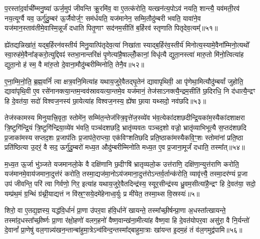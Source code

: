 प॒रस्ता॑द॒र्वाची᳚म्मनु॒ष्या॑ ऊर्ज॒मुप॑ जीवन्ति क्रू॒रमि॑व॒ वा ए॒तत्क॑रोति॒ यत्खन॑त्य॒पो\-ऽव॑ नयति॒ शान्त्यै॒ यव॑मती॒रव॑ नय॒त्यूर्ग्वै यव॒ ऊर्गु॑दु॒म्बर॑ ऊ॒र्जैवोर्ज॒ꣳ॒ सम॑र्धयति॒ यज॑मानेन॒ सम्मि॒तौदु॑म्बरी भवति॒ यावा॑ने॒व यज॑मान॒स्ताव॑तीमे॒वास्मि॒न्नूर्जं॑ दधाति पितृ॒णाꣳ सद॑नम॒सीति॑ ब॒र्\mbox{}हिरव॑ स्तृणाति पितृदेव॒त्यम्᳚॥५१॥

ह्ये॑तद्यन्निखा॑तं॒ यद्ब॒र्\mbox{}हिरन॑वस्तीर्य मिनु॒यात्पि॑तृदेव॒त्या॑ निखा॑ता स्याद्ब॒र्\mbox{}हिर॑व॒स्तीर्य॑ मिनोत्य॒स्यामे॒वैना᳚म्मिनो॒त्यथो᳚ स्वा॒रुह॑मे॒वैना᳚ङ्करो॒त्युद्दिवꣴ॑ स्तभा॒नान्तरि॑क्षं पृ॒णेत्या॑है॒षाल्लोँ॒कानां॒ विधृ॑त्यै द्युता॒नस्त्वा॑ मारु॒तो मि॑नो॒त्वित्या॑ह द्युता॒नो ह॑ स्म॒ वै मा॑रु॒तो दे॒वाना॒मौदु॑म्बरीम्मिनोति॒ तेनै॒व॥५२॥

ए॒ना॒म्मि॒नो॒ति॒ ब्र॒ह्म॒वनिं᳚ त्वा क्षत्र॒वनि॒मित्या॑ह यथाय॒जुरे॒वैतद्घृ॒तेन॑ द्यावापृथिवी॒ आ पृ॑णेथा॒मित्यौदु॑म्बर्यां जुहोति॒ द्यावा॑पृथि॒वी ए॒व रसे॑नानक्त्या॒न्तम॒न्वव॑स्रावयत्या॒न्तमे॒व यज॑मानं॒ तेज॑सा\-ऽनक्त्यै॒न्द्रम॒सीति॑ छ॒दिरधि॒ नि द॑धात्यै॒न्द्रꣳ हि दे॒वत॑या॒ सदो॑ विश्वज॒नस्य॑ छा॒येत्या॑ह विश्वज॒नस्य॒ ह्ये॑षा छा॒या यथ्सदो॒ नव॑छदि॥५३॥

तेज॑स्कामस्य मिनुयात्त्रि॒वृता॒ स्तोमे॑न॒ सम्मि॑त॒न्तेज॑स्त्रि॒वृत्ते॑ज॒स्व्ये॑व भ॑व॒त्येका॑दशछदीन्द्रि॒यका॑म॒स्यैका॑दशाक्षरा त्रि॒ष्टुगि॑न्द्रि॒यं त्रि॒ष्टुगि॑न्द्रिया॒व्ये॑व भ॑वति॒ पञ्च॑दशछदि॒ भ्रातृ॑व्यवतः पञ्चद॒शो वज्रो॒ भ्रातृ॑व्याभिभूत्यै स॒प्तद॑शछदि प्र॒जाका॑मस्य सप्तद॒शः प्र॒जाप॑तिः प्र॒जाप॑ते॒राप्त्या॒ एक॑विꣳशतिछदि प्रति॒ष्ठाका॑मस्यैकवि॒ꣳ॒शः स्तोमा॑नां प्रति॒ष्ठा प्रति॑ष्ठित्या उ॒दरं॒ वै सद॒ ऊर्गु॑दु॒म्बरो॑ मध्य॒त औदु॑म्बरीम्मिनोति मध्य॒त ए॒व प्र॒जाना॒मूर्जं॑ दधाति॒ तस्मा᳚त्॥५४॥

म॒ध्य॒त ऊ॒र्जा भु॑ञ्जते यजमानलो॒के वै दक्षि॑णानि छ॒दीꣳषि॑ भ्रातृव्यलो॒क उत्त॑राणि॒ दक्षि॑णा॒न्युत्त॑राणि करोति॒ यज॑मानमे॒वाय॑जमाना॒दुत्त॑रं करोति॒ तस्मा॒द्यज॑मा॒नो\-ऽय॑जमाना॒दुत्त॑रो\-ऽन्तर्व॒र्तान्क॑रोति॒ व्यावृ॑त्त्यै॒ तस्मा॒दर॑ण्यं प्र॒जा उप॑ जीवन्ति॒ परि॑ त्वा गिर्वणो॒ गिर॒ इत्या॑ह यथाय॒जुरे॒वैतदिन्द्र॑स्य॒ स्यूर॒सीन्द्र॑स्य ध्रु॒वम॒सीत्या॑है॒न्द्रꣳ हि दे॒वत॑या॒ सदो॒ यम्प्र॑थ॒मं ग्र॒न्थिं ग्र॑थ्नी॒याद्यत्तं न वि॑स्र॒ꣳ॒सये॒दमे॑हेनाध्व॒र्युः प्र मी॑येत॒ तस्मा॒थ्स वि॒स्रस्यः॑॥५॥

{\anuvakamend[{अप॑हत्यै॒ तस्मा᳚त्पितृदेव॒त्य॑न्तेनै॒व नव॑छदि॒ तस्मा॒थ्सदः॒ पञ्च॑दश च}]}%

शिरो॒ वा ए॒तद्य॒ज्ञस्य॒ यद्ध॑वि॒र्धानं॑ प्रा॒णा उ॑पर॒वा ह॑वि॒र्धाने॑ खायन्ते॒ तस्मा᳚च्छी॒र्\mbox{}षन्प्रा॒णा अ॒धस्ता᳚त्खायन्ते॒ तस्मा॑द॒धस्ता᳚च्छी॒र्ष्णः प्रा॒णा र॑क्षो॒हणो॑ वलग॒हनो॑ वैष्ण॒वान्ख॑ना॒मीत्या॑ह वैष्ण॒वा हि दे॒वत॑योपर॒वा असु॑रा॒ वै नि॒र्यन्तो॑ दे॒वानां᳚ प्रा॒णेषु॑ वल॒गान्न्य॑खन॒न्तान्बा॑हुमा॒त्रे\-ऽन्व॑विन्द॒न्तस्मा᳚द्बाहुमा॒त्राः खा॑यन्त इ॒दम॒हं तं व॑ल॒गमुद्व॑पामि॥५६॥

